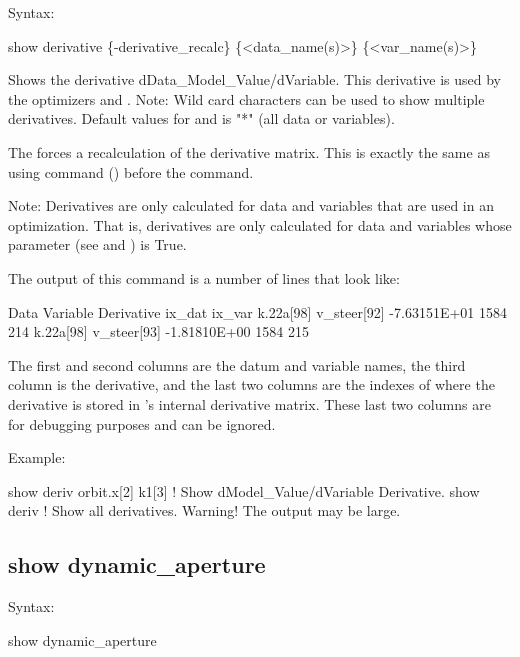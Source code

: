 {{{{{{{{Syntax:
\begin{example}
  show derivative \{-derivative_recalc\} \{<data_name(s)>\} \{<var_name(s)>\}
\end{example}

Shows the derivative dData_Model_Value/dVariable. This derivative is used by the optimizers 
and . Note: Wild card characters can be used to show multiple derivatives.  Default values
for  and  is "*" (all data or variables).

The  forces a recalculation of the derivative matrix. This is exactly the
same as using  command () before the  command.

Note: Derivatives are only calculated for data and variables that are used in an optimization. That
is, derivatives are only calculated for data and variables whose  parameter (see
 and ) is True.

The output of this command is a number of lines that look like:
\begin{example}
  Data                Variable               Derivative   ix_dat  ix_var
  k.22a[98]           v_steer[92]           -7.63151E+01    1584     214
  k.22a[98]           v_steer[93]           -1.81810E+00    1584     215
\end{example}
The first and second columns are the datum and variable names, the third column is the derivative,
and the last two columns are the indexes of where the derivative is stored in \tao's internal
derivative matrix. These last two columns are for debugging purposes and can be ignored.

Example:
\begin{example}
  show deriv orbit.x[2] k1[3] ! Show dModel_Value/dVariable Derivative.
  show deriv                  ! Show all derivatives. Warning! The output may be large.

\end{example}


\subsection{show dynamic_aperture}
\label{s:show.da}

Syntax:
\begin{example}
  show dynamic_aperture
\end{example}

}}}}}}}}
